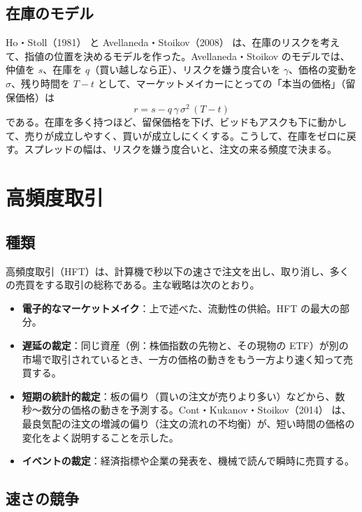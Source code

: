 \subsection{在庫のモデル}

Ho・Stoll（1981）\cite{hostoll1981} と Avellaneda・Stoikov（2008）\cite{avellanedastoikov2008} は、在庫のリスクを考えて、指値の位置を決めるモデルを作った。Avellaneda・Stoikov のモデルでは、仲値を $s$、在庫を $q$（買い越しなら正）、リスクを嫌う度合いを $\gamma$、価格の変動を $\sigma$、残り時間を $T-t$ として、マーケットメイカーにとっての「本当の価格」（留保価格）は
\begin{equation}
r = s - q\,\gamma\,\sigma^2\,(T - t)
\end{equation}
である。在庫を多く持つほど、留保価格を下げ、ビッドもアスクも下に動かして、売りが成立しやすく、買いが成立しにくくする。こうして、在庫をゼロに戻す。スプレッドの幅は、リスクを嫌う度合いと、注文の来る頻度で決まる。

\section{高頻度取引}

\subsection{種類}

高頻度取引（HFT）は、計算機で秒以下の速さで注文を出し、取り消し、多くの売買をする取引の総称である。主な戦略は次のとおり。

\begin{itemize}
\item \textbf{電子的なマーケットメイク}：上で述べた、流動性の供給。HFT の最大の部分。
\item \textbf{遅延の裁定}：同じ資産（例：株価指数の先物と、その現物の ETF）が別の市場で取引されているとき、一方の価格の動きをもう一方より速く知って売買する。
\item \textbf{短期の統計的裁定}：板の偏り（買いの注文が売りより多い）などから、数秒〜数分の価格の動きを予測する。Cont・Kukanov・Stoikov（2014）\cite{cks2014} は、最良気配の注文の増減の偏り（注文の流れの不均衡）が、短い時間の価格の変化をよく説明することを示した。
\item \textbf{イベントの裁定}：経済指標や企業の発表を、機械で読んで瞬時に売買する。
\end{itemize}

\subsection{速さの競争}

